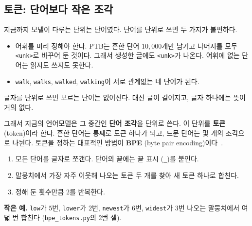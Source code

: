 \documentclass[11pt,a4paper]{article}
\newcommand{\w}[1]{\texttt{#1}}
\begin{document}
\subsection{토큰: 단어보다 작은 조각}

지금까지 모델이 다루는 단위는 단어였다. 단어를 단위로 쓰면 두 가지가 불편하다.
\begin{itemize}[leftmargin=1.5em]
\item 어휘를 미리 정해야 한다. PTB는 흔한 단어 $10{,}000$개만 남기고 나머지를 모두 \w{<unk>}로 바꾸어 둔 것이다. 그래서 생성한 글에도 \w{<unk>}가 나온다. 어휘에 없는 단어는 읽지도 쓰지도 못한다.
\item \w{walk}, \w{walks}, \w{walked}, \w{walking}이 서로 관계없는 네 단어가 된다.
\end{itemize}
글자를 단위로 쓰면 모르는 단어는 없어진다. 대신 글이 길어지고, 글자 하나에는 뜻이 거의 없다.

그래서 지금의 언어모델은 그 중간인 \textbf{단어 조각}을 단위로 쓴다. 이 단위를 \textbf{토큰} (token)이라 한다.
흔한 단어는 통째로 토큰 하나가 되고, 드문 단어는 몇 개의 조각으로 나뉜다.
토큰을 정하는 대표적인 방법이 \textbf{BPE} (byte pair encoding)이다~\cite{sennrich2016}.
\begin{enumerate}[leftmargin=2em]
\item 모든 단어를 글자로 쪼갠다. 단어의 끝에는 끝 표시 (\w{\_})를 붙인다.
\item 말뭉치에서 가장 자주 이웃해 나오는 토큰 두 개를 찾아 새 토큰 하나로 합친다.
\item 정해 둔 횟수만큼 2를 반복한다.
\end{enumerate}

\textbf{작은 예.} \w{low}가 $5$번, \w{lower}가 $2$번, \w{newest}가 $6$번, \w{widest}가 $3$번 나오는 말뭉치에서 여덟 번 합친다 (\texttt{bpe\_tokens.py}의 2번 셀).
\end{document}
